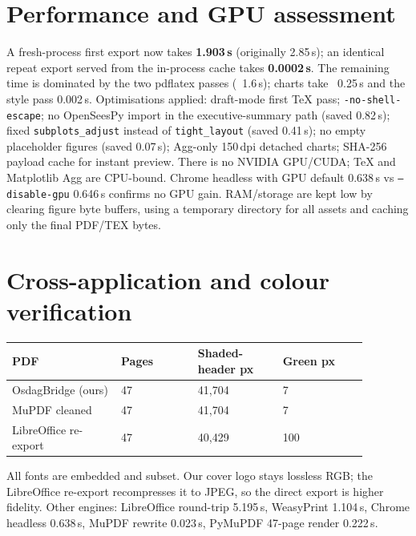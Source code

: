 \documentclass[11pt,a4paper]{article}
\begin{document}
\section{Performance and GPU assessment}
A fresh-process first export now takes \textbf{1.903\,s} (originally 2.85\,s); an identical repeat export served from the in-process cache takes \textbf{0.0002\,s}. The remaining time is dominated by the two pdflatex passes (~1.6\,s); charts take ~0.25\,s and the style pass 0.002\,s.
Optimisations applied: draft-mode first TeX pass; \texttt{-no-shell-escape}; no OpenSeesPy import in the executive-summary path (saved 0.82\,s); fixed \texttt{subplots\_adjust} instead of \texttt{tight\_layout} (saved 0.41\,s); no empty placeholder figures (saved 0.07\,s); Agg-only 150\,dpi detached charts; SHA-256 payload cache for instant preview.
There is no NVIDIA GPU/CUDA; TeX and Matplotlib Agg are CPU-bound. Chrome headless with GPU default 0.638\,s vs \texttt{--disable-gpu} 0.646\,s confirms no GPU gain. RAM/storage are kept low by clearing figure byte buffers, using a temporary directory for all assets and caching only the final PDF/TEX bytes.

\section{Cross-application and colour verification}
\begin{longtable}{p{0.27\linewidth}p{0.19\linewidth}p{0.21\linewidth}p{0.21\linewidth}}
\toprule
\textbf{PDF} & \textbf{Pages} & \textbf{Shaded-header px} & \textbf{Green px} \\
\midrule
OsdagBridge (ours) & 47 & 41,704 & 7 \\
MuPDF cleaned & 47 & 41,704 & 7 \\
LibreOffice re-export & 47 & 40,429 & 100 \\
\bottomrule
\end{longtable}
All fonts are embedded and subset. Our cover logo stays lossless RGB; the LibreOffice re-export recompresses it to JPEG, so the direct export is higher fidelity. Other engines: LibreOffice round-trip 5.195\,s, WeasyPrint 1.104\,s, Chrome headless 0.638\,s, MuPDF rewrite 0.023\,s, PyMuPDF 47-page render 0.222\,s.
\end{document}
